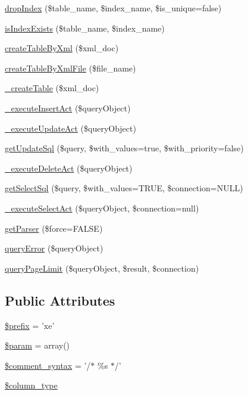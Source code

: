 \begin{DoxyCompactItemize}
\item 
\hyperlink{classDBMssql_a83bea7f71705370699eac384c5f93088}{drop\+Index} (\$table\+\_\+name, \$index\+\_\+name, \$is\+\_\+unique=false)
\item 
\hyperlink{classDBMssql_a17723942b3686527a68b72a1740136c3}{is\+Index\+Exists} (\$table\+\_\+name, \$index\+\_\+name)
\item 
\hyperlink{classDBMssql_a7a3ff51c1a29e47c02f358dc6064d88b}{create\+Table\+By\+Xml} (\$xml\+\_\+doc)
\item 
\hyperlink{classDBMssql_ae136845dee2ecc1bd8fe3a7c535572f4}{create\+Table\+By\+Xml\+File} (\$file\+\_\+name)
\item 
\hyperlink{classDBMssql_a0705365081b34014652f440380c53519}{\+\_\+create\+Table} (\$xml\+\_\+doc)
\item 
\hyperlink{classDBMssql_aa3f04ce5bee8d9e11db7de7293055fef}{\+\_\+execute\+Insert\+Act} (\$query\+Object)
\item 
\hyperlink{classDBMssql_a855a8b1b61f7840ce057f72fa5a39300}{\+\_\+execute\+Update\+Act} (\$query\+Object)
\item 
\hyperlink{classDBMssql_a10dad79ab29a55301ef2327fb27f86aa}{get\+Update\+Sql} (\$query, \$with\+\_\+values=true, \$with\+\_\+priority=false)
\item 
\hyperlink{classDBMssql_a871bd07e7224b27daba828686ee57a8a}{\+\_\+execute\+Delete\+Act} (\$query\+Object)
\item 
\hyperlink{classDBMssql_a37ed6e799c12ecafdea33d6fb0a84f87}{get\+Select\+Sql} (\$query, \$with\+\_\+values=T\+R\+U\+E, \$connection=N\+U\+L\+L)
\item 
\hyperlink{classDBMssql_a819a9181e9f34ce00f6f2d8a273813a6}{\+\_\+execute\+Select\+Act} (\$query\+Object, \$connection=null)
\item 
\hyperlink{classDBMssql_aa67e4dcd0df911a7c4e6325f21f0fb04}{get\+Parser} (\$force=F\+A\+L\+S\+E)
\item 
\hyperlink{classDBMssql_adeea6fd6090140a4b81051c5ff68cdfe}{query\+Error} (\$query\+Object)
\item 
\hyperlink{classDBMssql_a5a63ce969c396b656ac50e2251e798b9}{query\+Page\+Limit} (\$query\+Object, \$result, \$connection)
\end{DoxyCompactItemize}
\subsection*{Public Attributes}
\begin{DoxyCompactItemize}
\item 
\hyperlink{classDBMssql_a733cd192b424b5a66ea14e3e62391844}{\$prefix} = 'xe'
\item 
\hyperlink{classDBMssql_a352ee40852cea6dc20de096486603805}{\$param} = array()
\item 
\hyperlink{classDBMssql_ad095d953d508f44a326586a10c95336d}{\$comment\+\_\+syntax} = '/$\ast$ \%s $\ast$/'
\item 
\hyperlink{classDBMssql_a785e589df00c87bb0003b573aa5d7fee}{\$column\+\_\+type}
\end{DoxyCompactItemize}
